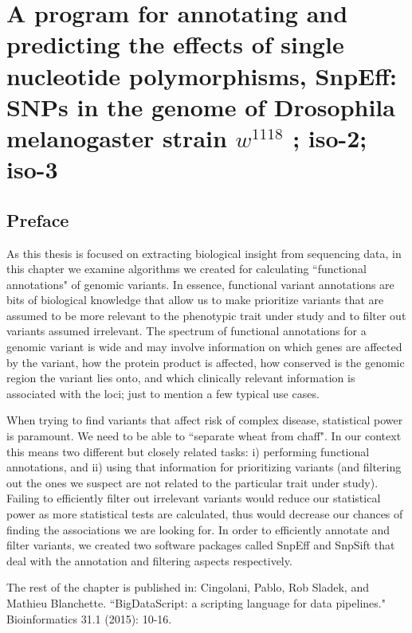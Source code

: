 
\chapter{A program for annotating and predicting the
effects of single nucleotide polymorphisms,
SnpEff: SNPs in the genome of Drosophila
melanogaster strain $w^{1118}$ ; iso-2; iso-3\label{ch:snpeff}}

\section{Preface}

As this thesis is focused on extracting biological insight from sequencing data, in this chapter we examine algorithms we created for calculating ``functional annotations" of genomic variants. In essence, functional variant annotations are bits of biological knowledge that allow us to make prioritize variants that are assumed to be more relevant to the phenotypic trait under study and to filter out variants assumed irrelevant. The spectrum of functional annotations for a genomic variant is wide and may involve information on which genes are affected by the variant, how the protein product is affected, how conserved is the genomic region the variant lies onto, and which clinically relevant information is associated with the loci; just to mention a few typical use cases.

When trying to find variants that affect risk of complex disease, statistical power is paramount. We need to be able to ``separate wheat from chaff". In our context this means two different but closely related tasks: i) performing functional annotations, and ii) using that information for prioritizing variants (and filtering out the ones we suspect are not related to the particular trait under study). Failing to efficiently filter out irrelevant variants would reduce our statistical power as more statistical tests are calculated, thus would decrease our chances of finding the associations we are looking for. In order to efficiently annotate and filter variants, we created two software packages called SnpEff and SnpSift that deal with the annotation and filtering aspects respectively.

The rest of the chapter is published in: Cingolani, Pablo, Rob Sladek, and Mathieu Blanchette. ``BigDataScript: a scripting language for data pipelines." Bioinformatics 31.1 (2015): 10-16.

